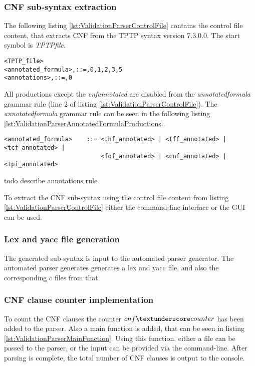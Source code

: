 \subsubsection{\ac{CNF} sub-syntax extraction}\label{sec:ValidationAutomatedParserGenerationBuildingBasicParserSubSyntax}
The following listing \ref{lst:ValidationParserControlFile} contains the control file content, that extracts \ac{CNF} from the TPTP syntax version 7.3.0.0.
The start symbol is \textit{TPTP\textunderscore file}.
\begin{lstlisting}[language = None, caption= Control file to extract \ac{CNF}, label= lst:ValidationParserControlFile]
<TPTP_file>
<annotated_formula>,::=,0,1,2,3,5
<annotations>,::=,0
\end{lstlisting}

All productions except the \textit{cnf\textunderscore annotated} are disabled from the \textit{annotated\textunderscore formula} grammar rule (line 2 of listing \ref{lst:ValidationParserControlFile}).
The \textit{annotated\textunderscore formula} grammar rule can be seen in the following listing \ref{lst:ValidationParserAnnotatedFormulaProductions}.
\begin{lstlisting}[language = None,caption= \textit{annotated\textunderscore formula} production rule, label= lst:ValidationParserAnnotatedFormulaProductions]
<annotated_formula>    ::= <thf_annotated> | <tff_annotated> | <tcf_annotated> |
                           <fof_annotated> | <cnf_annotated> | <tpi_annotated>
\end{lstlisting}

todo describe annotations rule

To extract the \ac{CNF} sub-syntax using the control file content from listing \ref{lst:ValidationParserControlFile} either the command-line interface or the GUI can be used.

\subsubsection{Lex and yacc file generation}\label{sec:ValidationAutomatedParserGenerationBuildingBasicParserGenerateFiles}
The generated sub-syntax is input to the automated parser generator.
The automated parser generates generates  a lex and yacc file, and also the corresponding c files from that.

\subsubsection{\ac{CNF} clause counter implementation}\label{sec:ValidationAutomatedParserGenerationBuildingBasicParserClauseCounter}
To count the \ac{CNF} clauses the counter $cnf\textunderscore counter$ has been added to the parser.
Also a main function is added, that can be seen in listing \ref{lst:ValidationParserMainFunction}.
Using this function, either a file can be passed to the parser, or the input can be provided via the command-line.
After parsing is complete, the total number of \ac{CNF} clauses is output to the console.

